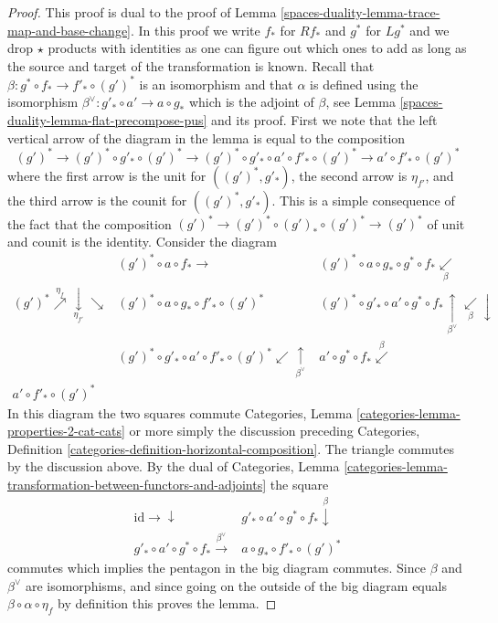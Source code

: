 \begin{proof}
This proof is dual to the proof of Lemma \ref{spaces-duality-lemma-trace-map-and-base-change}.
In this proof we write $f_*$ for $Rf_*$ and $g^*$ for $Lg^*$ and we
drop $\star$ products with identities as one can figure out which ones
to add as long as the source and target of the transformation is known.
Recall that $\beta : g^* \circ f_* \to f'_* \circ (g')^*$ is an isomorphism
and that $\alpha$ is defined using
the isomorphism $\beta^\vee : g'_* \circ a' \to a \circ g_*$
which is the adjoint of $\beta$, see Lemma \ref{spaces-duality-lemma-flat-precompose-pus}
and its proof. First we note that the left vertical arrow
of the diagram in the lemma is equal to the composition
$$
(g')^* \to (g')^* \circ g'_* \circ (g')^* \to
(g')^* \circ g'_* \circ a' \circ f'_* \circ (g')^* \to
a' \circ f'_* \circ (g')^*
$$
where the first arrow is the unit for $((g')^*, g'_*)$, the second arrow
is $\eta_{f'}$, and the third arrow is the counit for $((g')^*, g'_*)$.
This is a simple consequence of the fact that the composition
$(g')^* \to (g')^* \circ (g')_* \circ (g')^* \to (g')^*$
of unit and counit is the identity. Consider the diagram
$$
\begin{array}{ccc} & (g')^* \circ a \circ f_* \longrightarrow & (g')^* \circ a \circ g_* \circ g^* \circ f_*
\underset{\beta}{\swarrow} \\ (g')^* \overset{\eta_f}{\nearrow}\underset{\eta_{f'}}{\downarrow}\searrow & (g')^* \circ a \circ g_* \circ f'_* \circ (g')^* & (g')^* \circ g'_* \circ a' \circ g^* \circ f_*
\underset{\beta^\vee}{\uparrow}\underset{\beta}{\swarrow}\downarrow \\  & (g')^* \circ g'_* \circ a' \circ f'_* \circ (g')^*
\swarrow\underset{\beta^\vee}{\uparrow} & a' \circ g^* \circ f_* \overset{\beta}{\swarrow} \\ a' \circ f'_* \circ (g')^* &  & \end{array}
$$
In this diagram the two squares commute
Categories, Lemma \ref{categories-lemma-properties-2-cat-cats}
or more simply the discussion preceding
Categories, Definition \ref{categories-definition-horizontal-composition}.
The triangle commutes by the discussion above. By the dual of
Categories, Lemma
\ref{categories-lemma-transformation-between-functors-and-adjoints}
the square
$$
\begin{array}{cc}\text{id} \longrightarrow\downarrow & g'_* \circ a' \circ g^* \circ f_* \overset{\beta}{\downarrow} \\ g'_* \circ a' \circ g^* \circ f_* \overset{\beta^\vee}{\longrightarrow} & a \circ g_* \circ f'_* \circ (g')^*\end{array}
$$
commutes which implies the pentagon in the big diagram commutes.
Since $\beta$ and $\beta^\vee$ are isomorphisms, and since going on
the outside of the big diagram equals
$\beta \circ \alpha \circ \eta_f$ by definition this proves the lemma.
\end{proof}

